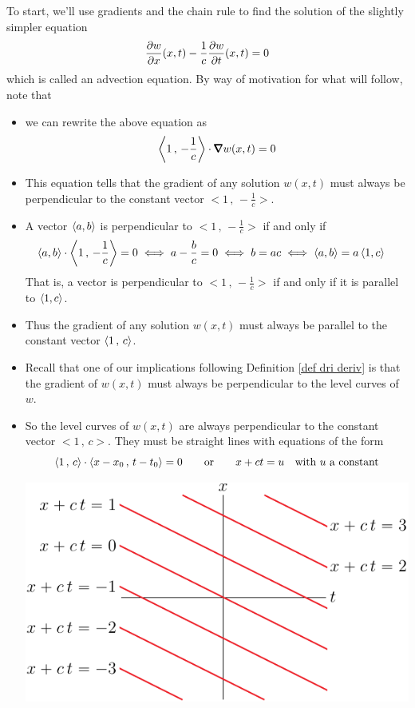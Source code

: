 To start, we'll use gradients and the chain rule to find the solution
of the slightly simpler equation
\begin{equation*}
\pdiff{w}{x}(x,t)-\frac{1}{c}\pdiff{w}{t}(x,t)=0
\end{equation*}
which is called an advection equation.
By way of motivation for what will follow, note that
\begin{itemize} 
\item 
we can rewrite the above equation as
\begin{equation*}
\llt 1\,,\,-\frac{1}{c}\rgt\cdot \vnabla w(x,t) =0
\end{equation*}
\item
This equation tells that the gradient of any solution $w(x,t)$ must always be 
perpendicular to the constant vector $\big< 1\,,\,-\frac{1}{c}\big>$.
\item
A vector $\left< a,b\right>$ is perpendicular to $\big< 1\,,\,-\frac{1}{c}\big>$
if and only if 
\begin{align*}
\left< a,b\right> \cdot \left< 1\,,\,-\frac{1}{c}\right> =0
&\iff a-\frac{b}{c} = 0
\iff b=ac
\iff \left< a,b\right> =a \left< 1,c\right>
\end{align*}
That is, a vector is perpendicular to $\big< 1\,,\,-\frac{1}{c}\big>$
if and only if it is parallel to $\left< 1,c\right>$.
\item
Thus the gradient of any solution $w(x,t)$ must always be parallel 
to the constant vector $\left< 1\,,\,c\right>$. 
\item 
Recall that one of our implications following Definition 
\ref{def dri deriv} is that the gradient of $w(x,t)$ must always be 
perpendicular to the level curves of $w$. 
\item
So the level curves of $w(x,t)$ are always perpendicular to the
constant vector $\big< 1\,,\,c\big>$. They must be straight lines
with equations of the form
\begin{equation*}
\left< 1\,,\,c\right>\cdot\left< x-x_0\,,\,t-t_0\right> =0\qquad\text{or}\qquad
x+ct=u\quad\text{with $u$ a constant}
\end{equation*}
\begin{nfig}
\begin{center}
   \includegraphics{level.pdf}
\end{center}
\end{nfig}


\end{itemize}
